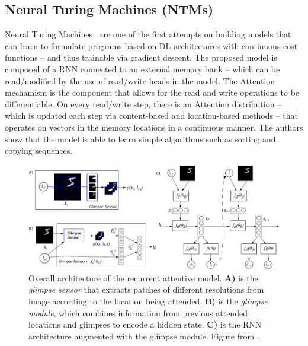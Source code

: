 \documentclass[English]{style/ic-tese-v3}
\begin{document}
\subsection{Neural Turing Machines (NTMs)}
Neural Turing Machines~\cite{ref:ntm} are one of the first attempts on building models that can learn to
formulate programs based on DL architectures with continuous cost functions
-- and thus trainable via gradient descent.
The proposed model is composed of a RNN connected to an external memory bank -- which can be read/modified
by the use of read/write heads in the model.
The Attention mechamism is the component that allows for the read and write operations to be differentiable.
On every read/write step, there is an Attention distribution
-- which is updated each step via content-based and location-based methods --
that operates on vectors in the memory locations in a continuous manner.
The authors show that the model is able to learn simple algorithms such as sorting and copying sequences.

\begin{figure}
\begin{center}
    \includegraphics[width=1.0\linewidth]{./img/recurr_model.png}
\caption{
    Overall architecture of the recurrent attentive model.
    \textbf{A)} is the \emph{glimpse sensor} that extracts patches of different resolutions from image
    according to the location being attended.
    \textbf{B)} is the \emph{glimpse module}, which combines information from previous attended locations
    and glimpses to encode a hidden state.
    \textbf{C)} is the RNN architecture augmented with the glimpse module.
    Figure from \cite{ref:rec-models}.
}
\label{fig:recurr-model}
\end{center}
\end{figure}
\end{document}
